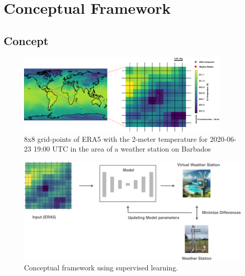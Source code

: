 \section{Conceptual Framework}
\label{sec: design}

\subsection{Concept}

\begin{figure}
    \centering
    \includegraphics[width=0.9\textwidth]{resources/images/ERA5_tas_around_barbados.png}
    \caption{8x8 grid-points of ERA5 with the 2-meter temperature 
    for 2020-06-23 19:00 UTC  in the area of a weather station on Barbados}    
    \label{fig: barbados}
\end{figure}

\begin{figure}
    \centering
    \includegraphics[width=\textwidth]{resources/images/supervised_learning.png}
    \caption{Conceptual framework using supervised learning.}
    \label{fig: supervised_learning}
\end{figure}

